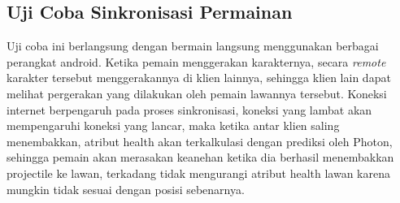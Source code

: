 \newpage
\subsection{Uji Coba Sinkronisasi Permainan}
\noindent

Uji coba ini berlangsung dengan bermain langsung menggunakan berbagai perangkat android. Ketika pemain menggerakan karakternya, secara \textit{remote} karakter tersebut menggerakannya di klien lainnya, sehingga klien lain dapat melihat pergerakan yang dilakukan oleh pemain lawannya tersebut. Koneksi internet berpengaruh pada proses sinkronisasi, koneksi yang lambat akan mempengaruhi koneksi yang lancar, maka ketika antar klien saling menembakkan, atribut health akan 
terkalkulasi dengan prediksi oleh Photon, sehingga pemain akan 
merasakan keanehan ketika dia berhasil menembakkan projectile
ke lawan, terkadang tidak mengurangi atribut health lawan karena 
mungkin tidak sesuai dengan posisi sebenarnya.

